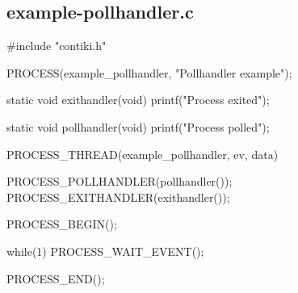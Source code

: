 \hypertarget{a00003}{\subsection{example-\/pollhandler.\-c}
}

\begin{DoxyCodeInclude}
#include "contiki.h"

PROCESS(example_pollhandler, "Pollhandler example");

static void
exithandler(void)
{
  printf("Process exited\n");
}

static void
pollhandler(void)
{
  printf("Process polled\n");
}

PROCESS_THREAD(example_pollhandler, ev, data)
{
  
  PROCESS_POLLHANDLER(pollhandler());
  PROCESS_EXITHANDLER(exithandler());

  PROCESS_BEGIN();

  while(1) {
    PROCESS_WAIT_EVENT();
  }
  
  PROCESS_END();
}
\end{DoxyCodeInclude}
 